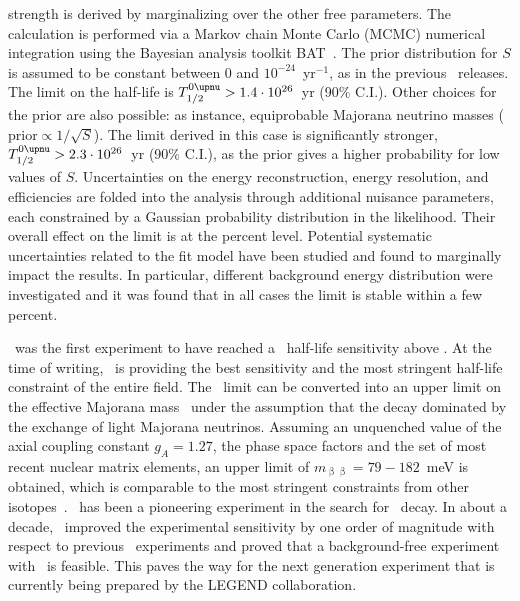 strength is derived by marginalizing over the other free parameters. The calculation is
performed via a Markov chain Monte Carlo (MCMC) numerical integration using the Bayesian
analysis toolkit BAT~\cite{Caldwell2008}. The prior distribution for $S$ is assumed to be
constant between 0 and $10^{-24}$~yr$^{-1}$, as in the previous \gerda\ releases. The
limit on the half-life is $\thalfzeroM > 1.4 \cdot 10^{26}$~yr (90\% C.I.). Other choices
for the prior are also possible: as instance, equiprobable Majorana neutrino masses
($\text{prior} \propto 1/\sqrt{S}$). The limit derived in this case is significantly
stronger, $\thalfzeroM > 2.3 \cdot 10^{26}$~yr (90\% C.I.), as the prior gives a higher
probability for low values of $S$.
\newpar
Uncertainties on the energy reconstruction, energy resolution, and efficiencies are folded
into the analysis through additional nuisance parameters, each constrained by a Gaussian
probability distribution in the likelihood. Their overall effect on the limit is at the
percent level. Potential systematic uncertainties related to the fit model have been
studied and found to marginally impact the results. In particular, different background
energy distribution were investigated and it was found that in all cases the limit is
stable within a few percent.

\gerda\ was the first experiment to have reached a \onbb\ half-life sensitivity above
. At the time of writing, \gerda\ is providing the best sensitivity and the
most stringent half-life constraint of the entire field.
\newpar
The \thalfzero\ limit can be converted into an upper limit on the effective Majorana mass
\mbb\ under the assumption that the decay dominated by the exchange of light Majorana
neutrinos. Assuming an unquenched value of the axial coupling constant $g_A = 1.27$, the
phase space factors and the set of most recent nuclear matrix elements, an upper limit of
$m_{\upbeta\upbeta} = 79 - 182$~meV is obtained, which is comparable to the most stringent
constraints from other isotopes~\cite{Anton2019, Gando2016, Adams2019}.  \gerda\ has been
a pioneering experiment in the search for \onbb\ decay. In about a decade, \gerda\
improved the experimental sensitivity by one order of magnitude with respect to previous
\gesix\ experiments and proved that a background-free experiment with \gesix\ is feasible.
This paves the way for the next generation experiment that is currently being prepared by
the LEGEND collaboration.

\chapendgliph{}

